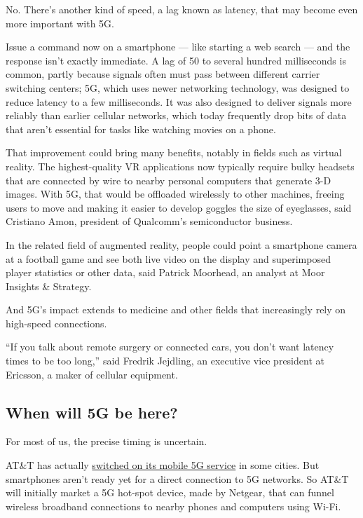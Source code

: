 No. There's another kind of speed, a lag known as latency, that may
become even more important with 5G.

Issue a command now on a smartphone --- like starting a web search ---
and the response isn't exactly immediate. A lag of 50 to several hundred
milliseconds is common, partly because signals often must pass between
different carrier switching centers; 5G, which uses newer networking
technology, was designed to reduce latency to a few milliseconds. It was
also designed to deliver signals more reliably than earlier cellular
networks, which today frequently drop bits of data that aren't essential
for tasks like watching movies on a phone.

That improvement could bring many benefits, notably in fields such as
virtual reality. The highest-quality VR applications now typically
require bulky headsets that are connected by wire to nearby personal
computers that generate 3-D images. With 5G, that would be offloaded
wirelessly to other machines, freeing users to move and making it easier
to develop goggles the size of eyeglasses, said Cristiano Amon,
president of Qualcomm's semiconductor business.

In the related field of augmented reality, people could point a
smartphone camera at a football game and see both live video on the
display and superimposed player statistics or other data, said Patrick
Moorhead, an analyst at Moor Insights \& Strategy.

And 5G's impact extends to medicine and other fields that increasingly
rely on high-speed connections.

``If you talk about remote surgery or connected cars, you don't want
latency times to be too long,'' said Fredrik Jejdling, an executive vice
president at Ericsson, a maker of cellular equipment.

\hypertarget{when-will-5g-be-here}{%
\subsection{When will 5G be here?}\label{when-will-5g-be-here}}

For most of us, the precise timing is uncertain.

AT\&T has actually
\href{https://www.theverge.com/2018/12/18/18146246/att-5g-us-launch-hotspot-service-plan-price}{switched
on its mobile 5G service} in some cities. But smartphones aren't ready
yet for a direct connection to 5G networks. So AT\&T will initially
market a 5G hot-spot device, made by Netgear, that can funnel wireless
broadband connections to nearby phones and computers using Wi-Fi.

